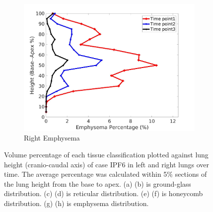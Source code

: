 \begin{figure}[H]
\begin{subfigure}{.42\linewidth}
  \includegraphics[width=\linewidth,trim={{.0\wd0} {.0\wd0} {.0\wd0} {.0\wd0}},clip]{Appendix/Image_AppexA/BaseToApex/IPF6RightLungEmphysemaDiseaseAgainstHeight.jpg}
  \caption{Right Emphysema}
  \label{fig:IPF6DiseaseAgainstHeight-h}
\end{subfigure}
\caption{Volume percentage of each tissue classification plotted against lung height (cranio-caudal axis) of case IPF6 in left and right lungs over time. The average percentage was calculated within 5\% sections of the lung height from the base to apex. (a) (b) is ground-glass distribution. (c) (d) is reticular distribution. (e) (f) is honeycomb distribution. (g) (h) is emphysema distribution.}
\label{fig:IPF6DiseaseAgainstHeight}
\end{figure}

